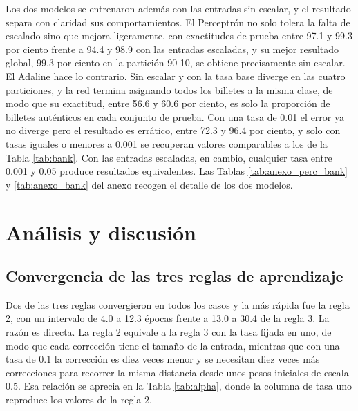 \documentclass[11pt,letterpaper]{article}
\begin{document}
Los dos modelos se entrenaron además con las entradas sin escalar, y el resultado separa con claridad sus comportamientos. El Perceptrón no solo tolera la falta de escalado sino que mejora ligeramente, con exactitudes de prueba entre 97.1 y 99.3 por ciento frente a 94.4 y 98.9 con las entradas escaladas, y su mejor resultado global, 99.3 por ciento en la partición 90-10, se obtiene precisamente sin escalar. El Adaline hace lo contrario. Sin escalar y con la tasa base diverge en las cuatro particiones, y la red termina asignando todos los billetes a la misma clase, de modo que su exactitud, entre 56.6 y 60.6 por ciento, es solo la proporción de billetes auténticos en cada conjunto de prueba. Con una tasa de 0.01 el error ya no diverge pero el resultado es errático, entre 72.3 y 96.4 por ciento, y solo con tasas iguales o menores a 0.001 se recuperan valores comparables a los de la Tabla \ref{tab:bank}. Con las entradas escaladas, en cambio, cualquier tasa entre 0.001 y 0.05 produce resultados equivalentes. Las Tablas \ref{tab:anexo_perc_bank} y \ref{tab:anexo_bank} del anexo recogen el detalle de los dos modelos.

\section{Análisis y discusión}

\subsection{Convergencia de las tres reglas de aprendizaje}

Dos de las tres reglas convergieron en todos los casos y la más rápida fue la regla 2, con un intervalo de 4.0 a 12.3 épocas frente a 13.0 a 30.4 de la regla 3. La razón es directa. La regla 2 equivale a la regla 3 con la tasa fijada en uno, de modo que cada corrección tiene el tamaño de la entrada, mientras que con una tasa de 0.1 la corrección es diez veces menor y se necesitan diez veces más correcciones para recorrer la misma distancia desde unos pesos iniciales de escala 0.5. Esa relación se aprecia en la Tabla \ref{tab:alpha}, donde la columna de tasa uno reproduce los valores de la regla 2.
\end{document}
